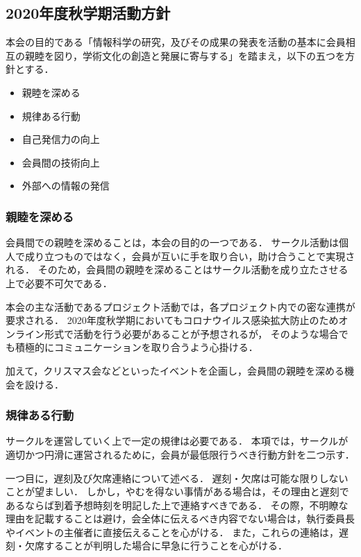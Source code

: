 \subsection*{2020年度秋学期活動方針}


本会の目的である「情報科学の研究，及びその成果の発表を活動の基本に会員相互の親睦を図り，学術文化の創造と発展に寄与する」を踏まえ，以下の五つを方針とする．

\begin{itemize}
    \item 親睦を深める
    \item 規律ある行動
    \item 自己発信力の向上
    \item 会員間の技術向上
    \item 外部への情報の発信
\end{itemize}

\subsubsection*{親睦を深める}
    会員間での親睦を深めることは，本会の目的の一つである．
    サークル活動は個人で成り立つものではなく，会員が互いに手を取り合い，助け合うことで実現される．
    そのため，会員間の親睦を深めることはサークル活動を成り立たさせる上で必要不可欠である．

    本会の主な活動であるプロジェクト活動では，各プロジェクト内での密な連携が要求される．
    2020年度秋学期においてもコロナウイルス感染拡大防止のためオンライン形式で活動を行う必要があることが予想されるが，
    そのような場合でも積極的にコミュニケーションを取り合うよう心掛ける．

    加えて，クリスマス会などといったイベントを企画し，会員間の親睦を深める機会を設ける．

\subsubsection*{規律ある行動}
    サークルを運営していく上で一定の規律は必要である．
    本項では，サークルが適切かつ円滑に運営されるために，会員が最低限行うべき行動方針を二つ示す．

    一つ目に，遅刻及び欠席連絡について述べる．
    遅刻・欠席は可能な限りしないことが望ましい．
    しかし，やむを得ない事情がある場合は，その理由と遅刻であるならば到着予想時刻を明記した上で連絡すべきである．
    その際，不明瞭な理由を記載することは避け，会全体に伝えるべき内容でない場合は，執行委員長やイベントの主催者に直接伝えることを心がける．
    また，これらの連絡は，遅刻・欠席することが判明した場合に早急に行うことを心がける．

